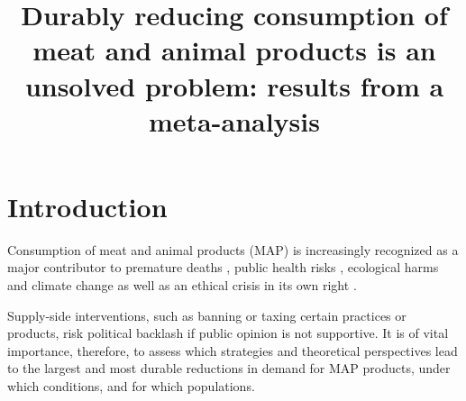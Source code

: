\documentclass[sn-nature,pdflatex]{sn-jnl}
\begin{document}
\title[MAP-reduction-meta]{Durably reducing consumption of meat and
animal products is an unsolved problem: results from a meta-analysis}


\author*[1]{  }

\author[1]{  }

\author[2]{  }








\maketitle

\section{Introduction}\label{sec1}

Consumption of meat and animal products (MAP) is increasingly recognized
as a major contributor to premature deaths
\citep{willett2019, landry2023}, public health risks
\citep{slingenbergh2004, graham2008}, ecological harms
\citep{greger2010} and climate change
\citep{scarborough2023, koneswaran2008} as well as an ethical crisis in
its own right \citep{kuruc2023, singer2023}.

Supply-side interventions, such as banning or taxing certain practices
or products, risk political backlash if public opinion is not
supportive. It is of vital importance, therefore, to assess which
strategies and theoretical perspectives lead to the largest and most
durable reductions in demand for MAP products, under which conditions,
and for which populations.
\end{document}
